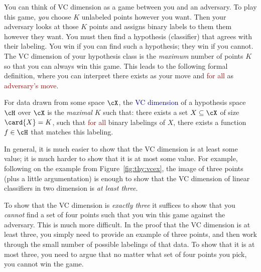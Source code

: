 
You can think of VC dimension as a game between you and an adversary.
To play this game, \emph{you} choose $K$ unlabeled points however you
want.  Then your adversary looks at those $K$ points and assigns
binary labels to them them however they want.  You must then find a
hypothesis (classifier) that agrees with their labeling.  You win if you
can find such a hypothesis; they win if you cannot.  The VC dimension
of your hypothesis class is the \emph{maximum} number of points $K$ so
that you can always win this game.  This leads to the following formal
definition, where you can interpret \textcolor{darkergreen}{there
  exists} as \textcolor{darkergreen}{your move} and
\textcolor{darkred}{for all} as \textcolor{darkred}{adversary's move}.

\begin{definition} \label{def:thy:vc} For data drawn from some space
  $\cX$, the \textcolor{darkblue}{VC dimension} of a hypothesis space
  $\cH$ over $\cX$ is the \emph{maximal} $K$ such that:
  \textcolor{darkergreen}{there exists} a set $X \subseteq \cX$ of
  size $\card{X}=K$, such that \textcolor{darkred}{for all} binary
  labelings of $X$, \textcolor{darkergreen}{there exists} a function
  $f \in \cH$ that matches this labeling.
\end{definition}

In general, it is much easier to show that the VC dimension is at
least some value; it is much harder to show that it is at most some
value.  For example, following on the example from
Figure~\ref{fig:thy:vcex}, the image of three points (plus a little
argumentation) is enough to show that the VC dimension of linear
classifiers in two dimension is \emph{at least three}.

To show that the VC dimension is \emph{exactly three} it suffices to
show that you \emph{cannot} find a set of four points such that you
win this game against the adversary.  This is much more difficult.  In
the proof that the VC dimension is at least three, you simply need to
provide an example of three points, and then work through the small
number of possible labelings of that data.  To show that it is at most
three, you need to argue that no matter what set of four points you
pick, you cannot win the game.






